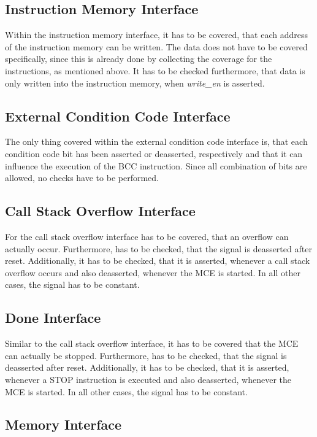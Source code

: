 \subsection{Instruction Memory Interface}

Within the instruction memory interface, it has to be covered, that each address of the instruction memory can be written. 
The data does not have to be covered specifically, since this is already done by collecting the coverage for the instructions, as mentioned above.
It has to be checked furthermore, that data is only written into the instruction memory, when \emph{write\_en} is asserted.

\subsection{External Condition Code Interface}

The only thing covered within the external condition code interface is, that each condition code bit has been asserted or deasserted, respectively and that it
can influence the execution of the BCC instruction.
Since all combination of bits are allowed, no checks have to be performed. 

\subsection{Call Stack Overflow Interface}

For the call stack overflow interface has to be covered, that an overflow can actually occur.
Furthermore, has to be checked, that the signal is deasserted after reset.
Additionally, it has to be checked, that it is asserted, whenever a call stack overflow occurs and also deasserted, whenever the MCE is started.
In all other cases, the signal has to be constant.

\subsection{Done Interface}

Similar to the call stack overflow interface, it has to be covered that the MCE can actually be stopped.
Furthermore, has to be checked, that the signal is deasserted after reset.
Additionally, it has to be checked, that it is asserted, whenever a STOP instruction is executed and also deasserted, whenever the MCE is started.
In all other cases, the signal has to be constant.

\subsection{Memory Interface}

